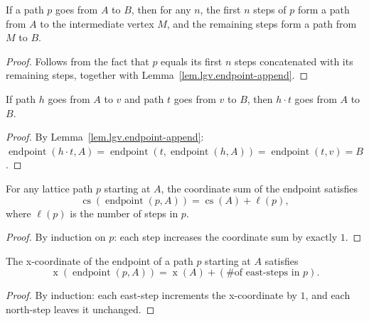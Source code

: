\begin{lemma}
\label{lem.lgv.path-take-drop}
\leanhelper
\leanok
If a path $p$ goes from $A$ to $B$, then for any $n$, the first $n$ steps of $p$ form a path from $A$
to the intermediate vertex $M$, and
the remaining steps form a path from $M$ to $B$.
\end{lemma}

\begin{proof}
\leanok
Follows from the fact that $p$ equals its first $n$ steps concatenated with its remaining steps,
together with Lemma~\ref{lem.lgv.endpoint-append}.
\end{proof}

\begin{lemma}
\label{lem.lgv.path-append}
\leanhelper
\leanok
If path $h$ goes from $A$ to $v$ and path $t$ goes from $v$ to $B$,
then $h \cdot t$ goes from $A$ to $B$.
\end{lemma}

\begin{proof}
\leanok
By Lemma~\ref{lem.lgv.endpoint-append}: $\operatorname{endpoint}(h \cdot t, A) =
\operatorname{endpoint}(t, \operatorname{endpoint}(h, A)) = \operatorname{endpoint}(t, v) = B$.
\end{proof}

\begin{lemma}
\label{lem.lgv.coordsum-endpoint}
\leanhelper
\leanok
For any lattice path $p$ starting at $A$, the coordinate sum of the endpoint satisfies
\[
  \operatorname{cs}(\operatorname{endpoint}(p, A)) = \operatorname{cs}(A) + \ell(p),
\]
where $\ell(p)$ is the number of steps in $p$.
\end{lemma}

\begin{proof}
By induction on $p$: each step increases the coordinate sum by exactly $1$.
\end{proof}

\begin{lemma}
\label{lem.lgv.endpoint-x}
\leanhelper
\leanok
The x-coordinate of the endpoint of a path $p$ starting at $A$ satisfies
\[
  \operatorname{x}(\operatorname{endpoint}(p, A)) = \operatorname{x}(A) + (\text{\# of east-steps in } p).
\]
\end{lemma}

\begin{proof}
\leanok
By induction: each east-step increments the x-coordinate by $1$, and each north-step
leaves it unchanged.
\end{proof}

